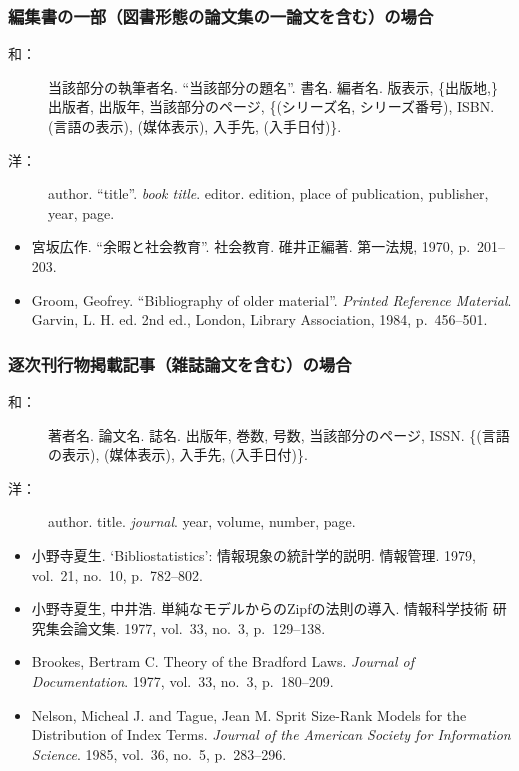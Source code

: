 		\subsubsection{編集書の一部（図書形態の論文集の一論文を含む）の場合}

			\begin{description}
				\item[和：] 当該部分の執筆者名. ``当該部分の題名''. 書名. 編者名. 版表示, \{出版地,\} 出版者, 出版年, 当該部分のページ, \{(シリーズ名, シリーズ番号), ISBN. (言語の表示), (媒体表示), 入手先, (入手日付)\}.
				\item[洋：] author. ``title''. \textit{book title}. editor. edition, place of publication, publisher, year, page.
			\end{description}

			\begin{screen} \begin{itemize}
				\item 宮坂広作. ``余暇と社会教育''. 社会教育. 碓井正編著. 第一法規, 1970, p.~201--203.

				\item Groom, Geofrey. ``Bibliography of older material''. \textit{Printed Reference Material}. Garvin, L. H. ed. 2nd ed., London, Library Association, 1984, p.~456--501.
			\end{itemize} \end{screen}


		\subsubsection{逐次刊行物掲載記事（雑誌論文を含む）の場合}

			\begin{description}
				\item[和：] 著者名. 論文名. 誌名. 出版年, 巻数, 号数, 当該部分のページ, ISSN. \{(言語の表示), (媒体表示), 入手先, (入手日付)\}.
				\item[洋：] author. title. \textit{journal}. year, volume, number, page.
			\end{description}

			\begin{screen} \begin{itemize}
				\item 小野寺夏生. `Bibliostatistics': 情報現象の統計学的説明. 情報管理.
				1979, vol.~21, no.~10, p.~782--802.

				\item 小野寺夏生, 中井浩. 単純なモデルからのZipfの法則の導入. 情報科学技術
				研究集会論文集. 1977, vol.~33, no.~3, p.~129--138.

				\item Brookes, Bertram C. Theory of the Bradford Laws. \textit{Journal of Documentation}. 1977, vol.~33, no.~3, p.~180--209.

				\item Nelson, Micheal J. and Tague, Jean M. Sprit Size-Rank Models for the Distribution of Index Terms. \textit{Journal of the American Society for Information Science}. 1985, vol.~36, no.~5, p.~283--296.
			\end{itemize} \end{screen}

